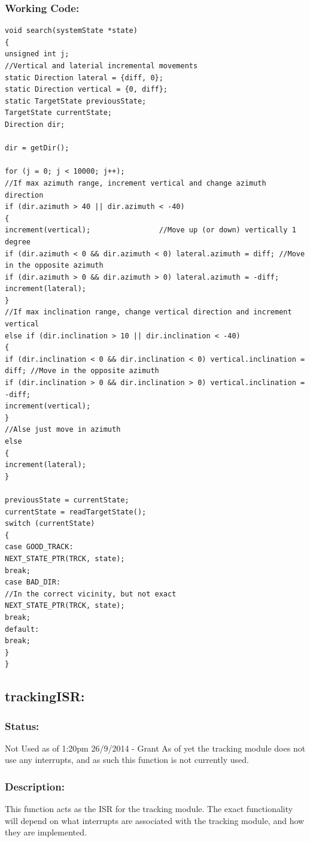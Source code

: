 \documentclass[]{report}
\begin{document}
\subsubsection{Working Code:}
\begin{lstlisting}
void search(systemState *state)
{
unsigned int j;
//Vertical and laterial incremental movements
static Direction lateral = {diff, 0};
static Direction vertical = {0, diff};
static TargetState previousState;
TargetState currentState;
Direction dir;

dir = getDir();

for (j = 0; j < 10000; j++);
//If max azimuth range, increment vertical and change azimuth direction
if (dir.azimuth > 40 || dir.azimuth < -40)
{
increment(vertical);                //Move up (or down) vertically 1 degree
if (dir.azimuth < 0 && dir.azimuth < 0) lateral.azimuth = diff; //Move in the opposite azimuth
if (dir.azimuth > 0 && dir.azimuth > 0) lateral.azimuth = -diff;
increment(lateral);
}
//If max inclination range, change vertical direction and increment vertical
else if (dir.inclination > 10 || dir.inclination < -40)
{
if (dir.inclination < 0 && dir.inclination < 0) vertical.inclination = diff; //Move in the opposite azimuth
if (dir.inclination > 0 && dir.inclination > 0) vertical.inclination = -diff;
increment(vertical);
}
//Alse just move in azimuth
else
{
increment(lateral);
}

previousState = currentState;
currentState = readTargetState();
switch (currentState)
{
case GOOD_TRACK:
NEXT_STATE_PTR(TRCK, state);
break;
case BAD_DIR:
//In the correct vicinity, but not exact
NEXT_STATE_PTR(TRCK, state);
break;
default:
break;
}
}
\end{lstlisting}

\subsection{trackingISR:}
\subsubsection{Status:}
Not Used as of 1:20pm 26/9/2014 - Grant \newline
As of yet the tracking module does not use any interrupts, and as such this function is not currently used.

\subsubsection{Description:}
This function acts as the ISR for the tracking module. The exact functionality will depend on what interrupts are associated with the tracking module, and how they are implemented.
\end{document}
